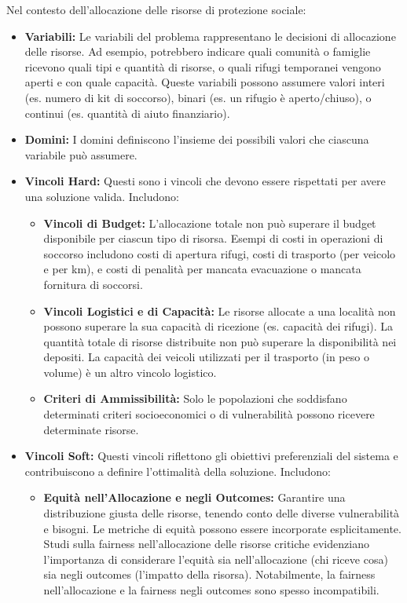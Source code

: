 \documentclass[letterpaper]{article}
\begin{document}
Nel contesto dell'allocazione delle risorse di protezione sociale:
\begin{itemize}
    \item \textbf{Variabili:} Le variabili del problema rappresentano le decisioni di allocazione delle risorse. Ad esempio, potrebbero indicare quali comunità o famiglie ricevono quali tipi e quantità di risorse, o quali rifugi temporanei vengono aperti e con quale capacità. Queste variabili possono assumere valori interi (es. numero di kit di soccorso), binari (es. un rifugio è aperto/chiuso), o continui (es. quantità di aiuto finanziario).
    \item \textbf{Domini:} I domini definiscono l'insieme dei possibili valori che ciascuna variabile può assumere.
    \item \textbf{Vincoli Hard:} Questi sono i vincoli che devono essere rispettati per avere una soluzione valida. Includono:
          \begin{itemize}
              \item \textbf{Vincoli di Budget:} L'allocazione totale non può superare il budget disponibile per ciascun tipo di risorsa. Esempi di costi in operazioni di soccorso includono costi di apertura rifugi, costi di trasporto (per veicolo e per km), e costi di penalità per mancata evacuazione o mancata fornitura di soccorsi.
              \item \textbf{Vincoli Logistici e di Capacità:} Le risorse allocate a una località non possono superare la sua capacità di ricezione (es. capacità dei rifugi). La quantità totale di risorse distribuite non può superare la disponibilità nei depositi. La capacità dei veicoli utilizzati per il trasporto (in peso o volume) è un altro vincolo logistico.
              \item \textbf{Criteri di Ammissibilità:} Solo le popolazioni che soddisfano determinati criteri socioeconomici o di vulnerabilità possono ricevere determinate risorse.
          \end{itemize}
    \item \textbf{Vincoli Soft:} Questi vincoli riflettono gli obiettivi preferenziali del sistema e contribuiscono a definire l'ottimalità della soluzione. Includono:
          \begin{itemize}
              \item \textbf{Equità nell'Allocazione e negli Outcomes:} Garantire una distribuzione giusta delle risorse, tenendo conto delle diverse vulnerabilità e bisogni. Le metriche di equità possono essere incorporate esplicitamente. Studi sulla fairness nell'allocazione delle risorse critiche evidenziano l'importanza di considerare l'equità sia nell'allocazione (chi riceve cosa) sia negli outcomes (l'impatto della risorsa). Notabilmente, la fairness nell'allocazione e la fairness negli outcomes sono spesso incompatibili.

\end{itemize}
\end{itemize}
\end{document}

